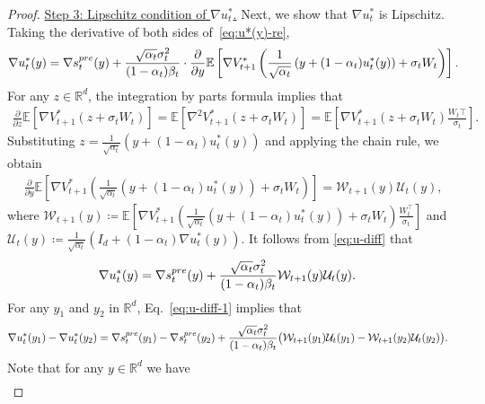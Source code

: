 \documentclass[10pt,a4paper]{amsart}
\newcommand{\R}{\mathbb{R}}
\newcommand{\bracket}[1]{\left[ #1 \right]}
\newcommand{\parenthesis}[1]{\left( #1 \right)}
\newcommand{\mcal}[1]{\mathcal{#1}}
\newcommand{\E}{\mathbb{E}}
\begin{document}
\begin{proof}
\underline{Step 3: Lipschitz condition of $  \nabla u_{t}^{*}$.} Next, we show that $\nabla u_t^*$ is Lipschitz. Taking the derivative of both sides of~\eqref{eq:u*(y)-re},
\begin{align}
    \nabla u_{t}^{*}(y) = \nabla s_{t}^{\rm pre}(y) + \frac{\sqrt{\alpha_{t}}\sigma_{t}^{2}}{(1 - \alpha_{t})\beta_t}\cdot\frac{\partial}{\partial y} \E\bracket{\nabla {V}^*_{t+1}\left(\frac{1}{\sqrt{\alpha_t}}\parenthesis{y + (1 - \alpha_t)u_t^{*}(y)} + \sigma_t W_t\right)}. \label{eq:u-diff}
\end{align}
For any $ z \in \R^{d} $, the integration by parts formula implies that
\begin{align}\label{eq:magic-1}
    \frac{\partial}{\partial z}\E\bracket{\nabla {V}^*_{t+1}\left(z + \sigma_t W_t\right)} = \E\bracket{\nabla^{2} {V}^*_{t+1}\left(z + \sigma_t W_t\right)} = \E\bracket{\nabla {V}^*_{t+1}\left(z + \sigma_t W_t\right)\frac{W_t\top}{\sigma_t}}.
\end{align}
Substituting $ z = \frac{1}{\sqrt{\alpha_t}}\parenthesis{y + (1 - \alpha_t)u_t^{*}(y)} $ and applying the chain rule, we obtain
\begin{align*}
     \frac{\partial}{\partial y}\E\bracket{\nabla {V}^*_{t+1}\left(\frac{1}{\sqrt{\alpha_t}}\parenthesis{y + (1 - \alpha_t)u_t^{*}(y)} + \sigma_t W_t\right)}  = \mcal{W}_{t+1}(y)\mcal{U}_t(y),
\end{align*}
where $\mcal{W}_{t+1}(y)  \coloneqq  \E\bracket{\nabla {V}^*_{t+1}\left(\frac{1}{\sqrt{\alpha_t}}\parenthesis{y + (1 - \alpha_t)u_t^{*}(y)} + \sigma_t W_t\right)\frac{W_t^\top}{\sigma_t}}$ and $\mathcal{U}_t(y) \coloneqq \frac{1}{\sqrt{\alpha_t}}\parenthesis{I_d + (1 - \alpha_t) \nabla u_t^*(y)}$. It follows from \eqref{eq:u-diff} that
\begin{align}
    \nabla u_{t}^{*}(y)  & = \nabla s_{t}^{\rm pre}(y)  + \frac{\sqrt{\alpha_{t}}\sigma_{t}^{2}}{(1 - \alpha_{t})\beta_t} \mcal{W}_{t+1}(y)\mcal{U}_t(y). \label{eq:u-diff-1}
\end{align}
For any $y_1$ and $y_2$ in $\R^d$, Eq.~\eqref{eq:u-diff-1} implies that %
\begin{align}
\nabla u_t^{*} (y_1) - \nabla u_t^{*} (y_2)  & = \nabla s_{t}^{\rm pre}(y_{1}) - \nabla s_{t}^{\rm pre}(y_{2})  +  \frac{\sqrt{\alpha_{t}}\sigma_{t}^{2}}{(1 - \alpha_{t})\beta_t} \big(\mcal{W}_{t+1}(y_1)\mcal{U}_t(y_1)  - \mcal{W}_{t+1}(y_2)\mcal{U}_t(y_2)\big). \label{eq:u-lip-1}
\end{align}
Note that for any $ y \in \R^d$ we have
\begin{align}

\end{align}
\end{proof}
\end{document}
